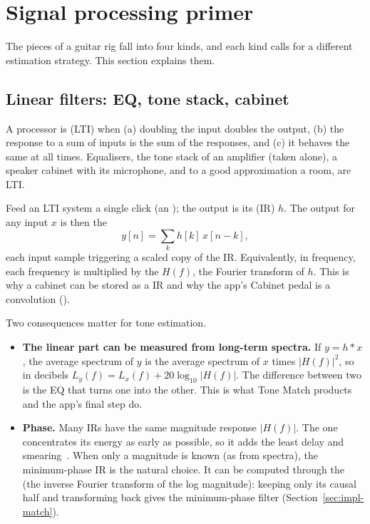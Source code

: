 \section{Signal processing primer}
\label{sec:dsp}

The pieces of a guitar rig fall into four kinds, and each kind calls for a
different estimation strategy. This section explains them.

\subsection{Linear filters: EQ, tone stack, cabinet}

A processor is  (LTI) when (a) doubling the
input doubles the output, (b) the response to a sum of inputs is the sum of the
responses, and (c) it behaves the same at all times. Equalisers, the tone stack
of an amplifier (taken alone), a speaker cabinet with its microphone, and to a
good approximation a room, are LTI.

\begin{keyidea}
Feed an LTI system a single click (an ); the output is its
 (IR) $h$. The output for any input $x$ is then the
\[
  y[n] = \sum_{k} h[k]\,x[n-k],
\]
each input sample triggering a scaled copy of the IR. Equivalently, in
frequency, each frequency is multiplied by the 
$H(f)$, the Fourier transform of $h$. This is why a cabinet can be stored as a
 IR and why the app's Cabinet pedal is a convolution
().
\end{keyidea}

Two consequences matter for tone estimation.
\begin{itemize}
\item \textbf{The linear part can be measured from long-term spectra.} If
  $y = h * x$, the average spectrum of $y$ is the average spectrum of $x$
  times $|H(f)|^2$, so in decibels
  $L_y(f) = L_x(f) + 20\log_{10}|H(f)|$. The difference between two
   is the EQ that turns one into the other.
  This is what Tone Match products and the app's final step do.
\item \textbf{Phase.} Many IRs have the same magnitude response $|H(f)|$. The
   one concentrates its energy as early as possible, so it
  adds the least delay and smearing~\cite{oppenheim2010dtsp}. When only a
  magnitude is known (as from spectra), the minimum-phase IR is the natural
  choice. It can be computed through the  (the inverse Fourier
  transform of the log magnitude): keeping only its causal half and
  transforming back gives the minimum-phase filter (Section~\ref{sec:impl-match}).
\end{itemize}


